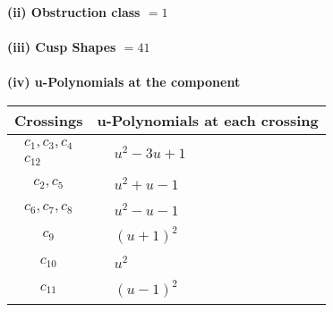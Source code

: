 \documentclass[1p]{elsarticle_modified}
\theoremstyle{definition}
\begin{document}
\flushleft \textbf{(ii) Obstruction class $= 1$}\\~\\
\flushleft \textbf{(iii) Cusp Shapes $= 41$}\\~\\
\newpage\renewcommand{\arraystretch}{1}
\flushleft \textbf{(iv) u-Polynomials at the component}\newline \\
\begin{tabular}{m{50pt}|m{274pt}}
Crossings & \hspace{64pt}u-Polynomials at each crossing \\
\hline $$\begin{aligned}c_{1},c_{3},c_{4}\\c_{12}\end{aligned}$$&$\begin{aligned}
&u^2-3 u+1
\end{aligned}$\\
\hline $$\begin{aligned}c_{2},c_{5}\end{aligned}$$&$\begin{aligned}
&u^2+u-1
\end{aligned}$\\
\hline $$\begin{aligned}c_{6},c_{7},c_{8}\end{aligned}$$&$\begin{aligned}
&u^2- u-1
\end{aligned}$\\
\hline $$\begin{aligned}c_{9}\end{aligned}$$&$\begin{aligned}
&(u+1)^2
\end{aligned}$\\
\hline $$\begin{aligned}c_{10}\end{aligned}$$&$\begin{aligned}
&u^2
\end{aligned}$\\
\hline $$\begin{aligned}c_{11}\end{aligned}$$&$\begin{aligned}
&(u-1)^2
\end{aligned}$\\
\hline
\end{tabular}\\~\\
\end{document}

